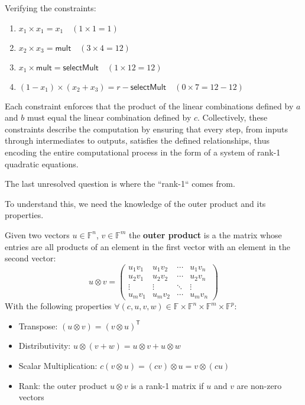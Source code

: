 \documentclass[../lecture-notes.tex]{subfiles}
\begin{document}
\begin{example}
    Verifying the constraints:
    \begin{enumerate}
        \item \( x_1 \times x_1 = x_1 \quad (1 \times 1 = 1) \)
        \item \( x_2 \times x_3 = \mathsf{mult} \quad (3 \times 4 = 12) \)
        \item \( x_1 \times \mathsf{mult} = \mathsf{selectMult} \quad (1 \times 12 = 12) \)
        \item \( (1 - x_1) \times (x_2 + x_3) = r - \mathsf{selectMult} \quad (0 \times 7 = 12 - 12) \)
    \end{enumerate}
\end{example}

Each constraint enforces that the product of the linear combinations defined by $a$ and $b$ must
equal the linear combination defined by $c$. Collectively, these constraints describe the 
computation by ensuring that every step, from inputs through intermediates to outputs, satisfies 
the defined relationships, thus encoding the entire computational process in the form of a system
of rank-1 quadratic equations.

The last unresolved question is where the ``rank-1`` comes from.

To understand this, we need the knowledge of the outer product and its properties.

\begin{definition}
    Given two vectors $u \in \mathbb{F}^n$, $v \in \mathbb{F}^m$ the \textbf{outer product} is a
    the matrix whose entries are all products of an element in the first vector with an element 
    in the second vector:
    \begin{equation*}
        u \otimes v = \begin{pmatrix}
            u_1 v_1 & u_1 v_2 & \cdots & u_1 v_n \\
            u_2 v_1 & u_2 v_2 & \cdots & u_2 v_n \\
            \vdots & \vdots & \ddots & \vdots \\
            u_m v_1 & u_m v_2 & \cdots & u_m v_n
        \end{pmatrix}
    \end{equation*}
    With the following properties $\forall (c, u, v, w) \in \mathbb{F} \times \mathbb{F}^n \times \mathbb{F}^m \times \mathbb{F}^p$:
    \begin{itemize}
        \item Transpose: $(u \otimes v) = (v \otimes u)^{\textsf{T}}$
        \item Distributivity: $u \otimes (v + w) = u \otimes v + u \otimes w$
        \item Scalar Multiplication: $c(v \otimes u) = (cv) \otimes u = v \otimes (cu)$
        \item Rank: the outer product $u \otimes v$ is a rank-1 matrix if $u$ and $v$ are non-zero
        vectors
    \end{itemize}
\end{definition}
\end{document}
